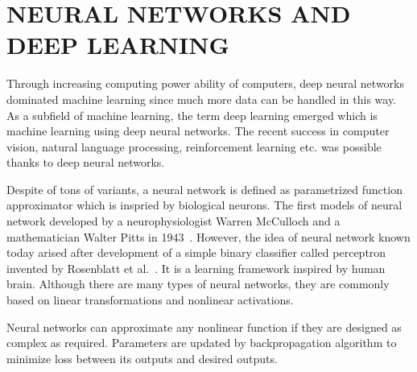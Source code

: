 \chapter{NEURAL NETWORKS AND DEEP LEARNING}
\label{chap:dnns}

Through increasing computing power ability of computers, 
deep neural networks dominated machine learning since much more data can be handled in this way. 
As a subfield of machine learning, the term deep learning emerged which is machine learning using deep neural networks. 
The recent success in computer vision, natural language processing, 
reinforcement learning etc. was possible thanks to deep neural networks. 

Despite of tons of variants, a neural network is defined as parametrized function approximator which is inspried by biological neurons. 
The first models of neural network developed by a neurophysiologist Warren McCulloch and a mathematician Walter Pitts in 1943~\cite{mcculloch_logical_1943}. 
However, the idea of neural network known today arised after development of a simple binary classifier called perceptron invented by Rosenblatt et al.~\cite{rosenblatt_perceptron_1958}. 
It is a learning framework inspired by human brain. Although there are many types of neural networks, 
they are commonly based on linear transformations and nonlinear activations.

Neural networks can approximate any nonlinear function if they are designed as complex as required. 
Parameters are updated by backpropagation algorithm to minimize loss between its outputs and desired outputs.
